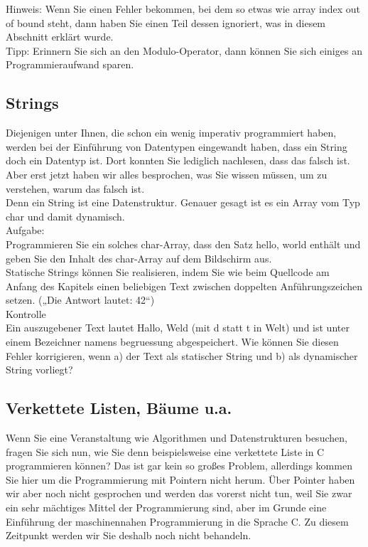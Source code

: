 Hinweis: Wenn Sie einen Fehler bekommen, bei dem so etwas wie array index out of bound steht, dann haben Sie einen Teil dessen ignoriert, was in diesem Abschnitt erklärt wurde.\\

Tipp: Erinnern Sie sich an den Modulo-Operator, dann können Sie sich einiges an Programmieraufwand sparen.

\subsection{Strings}

Diejenigen unter Ihnen, die schon ein wenig imperativ programmiert haben, werden bei der Einführung von Datentypen eingewandt haben, dass ein String doch ein Datentyp ist. Dort konnten Sie lediglich nachlesen, dass das falsch ist. Aber erst jetzt haben wir alles besprochen, was Sie wissen müssen, um zu verstehen, warum das falsch ist.\\

Denn ein String ist eine Datenstruktur. Genauer gesagt ist es ein Array vom Typ char und damit dynamisch.\\

Aufgabe:\\

Programmieren Sie ein solches char-Array, dass den Satz hello, world enthält und geben Sie den Inhalt des char-Array auf dem Bildschirm aus.\\

Statische Strings können Sie realisieren, indem Sie wie beim Quellcode am Anfang des Kapitels einen beliebigen Text zwischen doppelten Anführungszeichen setzen. („Die Antwort lautet: 42“)\\

Kontrolle\\

Ein auszugebener Text lautet Hallo, Weld (mit d statt t in Welt) und ist unter einem Bezeichner namens begruessung abgespeichert. Wie können Sie diesen Fehler korrigieren, wenn a) der Text als statischer String und b) als dynamischer String vorliegt?

\subsection{Verkettete Listen, Bäume u.a.}

Wenn Sie eine Veranstaltung wie Algorithmen und Datenstrukturen besuchen, fragen Sie sich nun, wie Sie denn beispielsweise eine verkettete Liste in C programmieren können? Das ist gar kein so großes Problem, allerdings kommen Sie hier um die Programmierung mit Pointern nicht herum. Über Pointer haben wir aber noch nicht gesprochen und werden das vorerst nicht tun, weil Sie zwar ein sehr mächtiges Mittel der Programmierung sind, aber im Grunde eine Einführung der maschinennahen Programmierung in die Sprache C. Zu diesem Zeitpunkt werden wir Sie deshalb noch nicht behandeln. 


